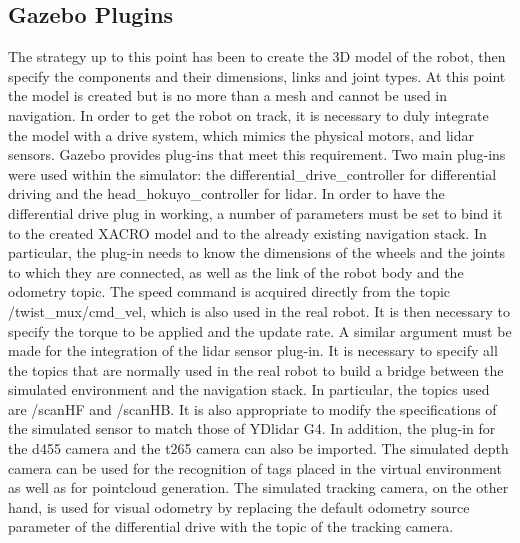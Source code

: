 \subsection{Gazebo Plugins}
The strategy up to this point has been to create the 3D model of the robot, then specify the components and their dimensions, links and joint types. At this point the model is created but is no more than a mesh and cannot be used in navigation. In order to get the robot on track, it is necessary to duly integrate the model with a drive system, which mimics the physical motors, and lidar sensors. 
Gazebo provides plug-ins that meet this requirement. Two main plug-ins were used within the simulator: the differential\_drive\_controller for differential driving and the head\_hokuyo\_controller for lidar. 
In order to have the differential drive plug in working, a number of parameters must be set to bind it to the created XACRO model and to the already existing navigation stack. In particular, the plug-in needs to know the dimensions of the wheels and the joints to which they are connected, as well as the link of the robot body and the odometry topic. The speed command is acquired directly from the topic /twist\_mux/cmd\_vel, which is also used in the real robot. It is then necessary to specify the torque to be applied and the update rate. 
A similar argument must be made for the integration of the lidar sensor plug-in. It is necessary to specify all the topics that are normally used in the real robot to build a bridge between the simulated environment and the navigation stack. In particular, the topics used are /scanHF and /scanHB. It is also appropriate to modify the specifications of the simulated sensor to match those of YDlidar G4.
In addition, the plug-in for the d455 camera and the t265 camera can also be imported. The simulated depth camera can be used for the recognition of tags placed in the virtual environment as well as for pointcloud generation. The simulated tracking camera, on the other hand, is used for visual odometry by replacing the default odometry source parameter of the differential drive with the topic of the tracking camera.

